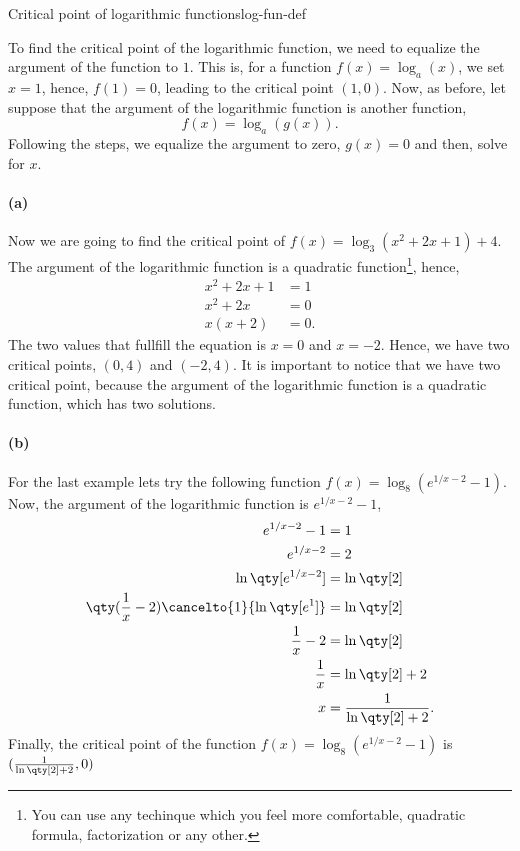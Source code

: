 \documentclass[../main.tex]{subfiles}
\begin{document}
\begin{example}{Critical point of logarithmic functions}{log-fun-def}

To find the critical point of the logarithmic function, we need to equalize the argument of the function to $1$.
This is, for a function $f(x)=\log_a(x)$, we set $x=1$, hence, $f(1)=0$, leading to the critical point $(1,0)$.
Now, as before, let suppose that the argument of the logarithmic function is another function, \[f(x)=\log_a(g(x)).\]
Following the steps, we equalize the argument to zero, $g(x)=0$ and then, solve for $x$.

\paragraph{(a)} Now we are going to find the critical point of $f(x)=\log_3(x^2+2x+1)+4$.
The argument of the logarithmic function is a quadratic function\footnote{You can use any techinque which you feel more comfortable, quadratic formula, factorization or any other.}, hence,
\begin{align*}
    x^2+2x+1 &= 1 \\
    x^2+2x &= 0 \\
    x(x+2) &= 0.
\end{align*}
The two values that fullfill the equation is $x=0$ and $x=-2$.
Hence, we have two critical points, $(0,4)$ and $(-2,4)$.
It is important to notice that we have two critical point, because the argument of the logarithmic function is a quadratic function, which has two solutions.

\paragraph{(b)} For the last example lets try the following function $f(x)=\log_8(e^{1/x-2}-1)$.
Now, the argument of the logarithmic function is $e^{1/x-2}-1$,
\begin{align*}
    e^{1/x-2}-1 &= 1 \\
    e^{1/x-2} &= 2 \\
    \ln\qty[e^{1/x-2}] &= \ln\qty[2] \\
    \qty(\frac{1}{x}-2)\cancelto{1}{\ln\qty[e^1]} &= \ln\qty[2] \\
    \frac{1}{x}-2 &= \ln\qty[2] \\
    \frac{1}{x} &= \ln\qty[2] + 2\\
    x &= \frac{1}{\ln\qty[2] + 2}.
\end{align*}
Finally, the critical point of the function $f(x)=\log_8(e^{1/x-2}-1)$ is $(\frac{1}{\ln\qty[2] + 2},0)$

\end{example}
\end{document}
